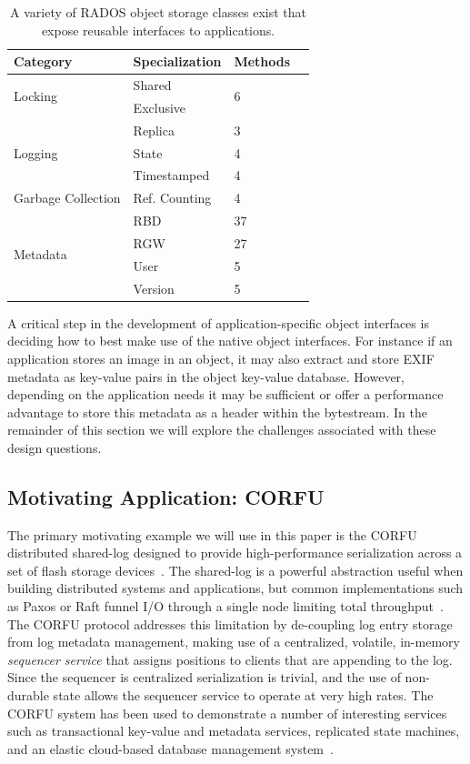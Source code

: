 \documentclass[10pt,twocolumn]{article}
\begin{document}
\begin{table}[ht]
\centering
\begin{tabularx}{\columnwidth}{|X|l|l|l|}
\hline
Category & Specialization & Methods \\ \hline
\multirow{2}{*}{Locking} & Shared & \multirow{2}{*}{6} \\
                         & Exclusive & \\ \hline
\multirow{3}{*}{Logging} & Replica & 3 \\
                         & State & 4 \\
                         & Timestamped & 4 \\ \hline
Garbage Collection & Ref. Counting & 4 \\ \hline
\multirow{4}{*}{Metadata} & RBD & 37 \\
 & RGW & 27 \\
 & User & 5 \\
 & Version & 5 \\ \hline
\end{tabularx}
\caption{A variety of RADOS object storage classes exist that expose reusable
interfaces to applications.}
\label{tab:objclass-cats}
\end{table}

A critical step in the development of application-specific object interfaces
is deciding how to best make use of the native object interfaces. For instance
if an application stores an image in an object, it may also extract and store
EXIF metadata as key-value pairs in the object key-value database.  However,
depending on the application needs it may be sufficient or offer a performance
advantage to store this metadata as a header within the bytestream. In the remainder
of this section we will explore the challenges associated with these design questions.

\subsection{Motivating Application: CORFU}

The primary motivating example we will use in this paper is the CORFU
distributed shared-log designed to provide high-performance serialization
across a set of flash storage devices~\cite{balakrishnan:nsdi12}. The
shared-log is a powerful abstraction useful when building distributed systems
and applications, but common implementations such as Paxos or Raft funnel I/O
through a single node limiting total throughput~\cite{lamport:tocs89}. The CORFU protocol addresses this limitation
by de-coupling log entry storage from log metadata management, making use of a
centralized, volatile, in-memory \emph{sequencer service} that assigns
positions to clients that are appending to the log. Since the sequencer is
centralized serialization is trivial, and the use of non-durable state allows
the sequencer service to operate at very high rates. The CORFU system has been
used to demonstrate a number of interesting services such as transactional
key-value and metadata services, replicated state machines, and an elastic
cloud-based database management system~\cite{balakrishnan:sosp13,bernstein:cidr11}.
\end{document}
